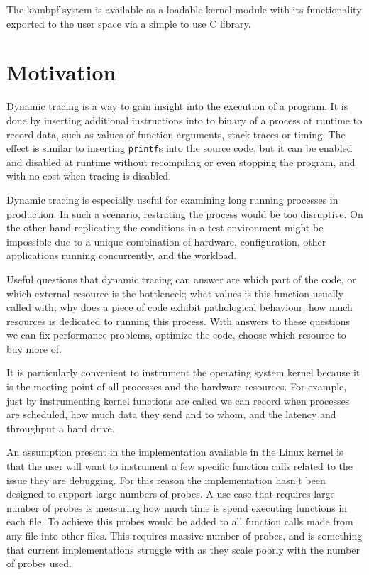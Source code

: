 \documentclass[12pt,twoside,notitlepage]{report}
\begin{document}
    The kambpf system is available as a loadable kernel module with its functionality exported to the user space via a simple to use C library.

    \section{Motivation}

        Dynamic tracing is a way to gain insight into the execution of a program. It is done by inserting additional instructions into to binary of a process at runtime to record data, such as values of function arguments, stack traces or timing. The effect is similar to inserting \texttt{printf}s into the source code, but it can be enabled and disabled at runtime without recompiling or even stopping the program, and with no cost when tracing is disabled.

        Dynamic tracing is especially useful for examining long running processes in production. In such a scenario, restrating the process would be too disruptive. On the other hand replicating the conditions in a test environment might be impossible due to a unique combination of hardware, configuration, other applications running concurrently, and the workload. 

        Useful questions that dynamic tracing can answer are which part of the code, or which external resource is the bottleneck; what values is this function usually called with; why does a piece of code exhibit pathological behaviour; how much resources is dedicated to running this process. With answers to these questions we can fix performance problems, optimize the code, choose which resource to buy more of.

        It is particularly convenient to instrument the operating system kernel because it is the meeting point of all processes and the hardware resources. For example, just by instrumenting kernel functions are called we can record when processes are scheduled, how much data they send and to whom, and the latency and throughput a hard drive.

        An assumption present in the implementation available in the Linux kernel  is that the user will want to instrument a few specific function calls related to the issue they are debugging. For this reason the implementation hasn't been designed to support large numbers of probes. A use case that requires large number of probes is measuring how much time is spend executing functions in each file. To achieve this probes would be added to all function calls made from any file into other files. This requires massive number of probes, and is something that current implementations struggle with as they scale poorly with the number of probes used.
\end{document}
